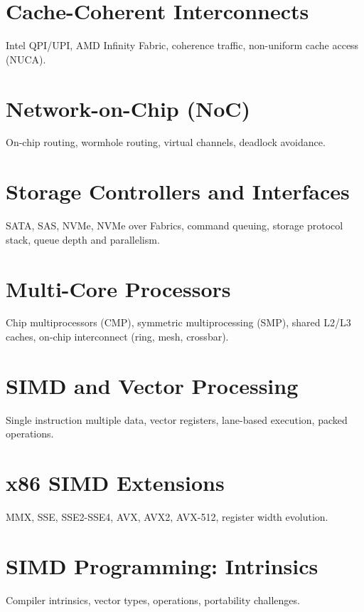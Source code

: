 \chapter{Cache-Coherent Interconnects}
Intel QPI/UPI, AMD Infinity Fabric, coherence traffic, non-uniform cache access (NUCA).

\chapter{Network-on-Chip (NoC)}
On-chip routing, wormhole routing, virtual channels, deadlock avoidance.

\chapter{Storage Controllers and Interfaces}
SATA, SAS, NVMe, NVMe over Fabrics, command queuing, storage protocol stack, queue depth and parallelism.


\chapter{Multi-Core Processors}
Chip multiprocessors (CMP), symmetric multiprocessing (SMP), shared L2/L3 caches, on-chip interconnect (ring, mesh, crossbar).

\chapter{SIMD and Vector Processing}
Single instruction multiple data, vector registers, lane-based execution, packed operations.

\chapter{x86 SIMD Extensions}
MMX, SSE, SSE2-SSE4, AVX, AVX2, AVX-512, register width evolution.

\chapter{SIMD Programming: Intrinsics}
Compiler intrinsics, vector types, operations, portability challenges.


